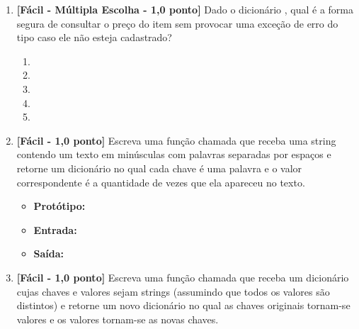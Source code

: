 \begin{enumerate}[label=\textbf{Q\arabic*.}, start=59]

\item \textbf{[Fácil - Múltipla Escolha - 1,0 ponto]} Dado o dicionário , qual é a forma segura de consultar o preço do item  sem provocar uma exceção de erro do tipo  caso ele não esteja cadastrado?

\begin{enumerate}[label=\textbf{(\Alph*)}]
    \item {}
    \item {}
    \item {}
    \item {}
    \item {}
\end{enumerate}



\vspace{0.4cm}

\item \textbf{[Fácil - 1,0 ponto]} Escreva uma função chamada  que receba uma string contendo um texto em minúsculas com palavras separadas por espaços e retorne um dicionário no qual cada chave é uma palavra e o valor correspondente é a quantidade de vezes que ela apareceu no texto.

\begin{itemize}[leftmargin=*]
    \item \textbf{Protótipo:}\newline {}\\
    \item \textbf{Entrada:} 
    \item \textbf{Saída:} 
\end{itemize}



\vspace{0.4cm}

\item \textbf{[Fácil - 1,0 ponto]} Escreva uma função chamada  que receba um dicionário cujas chaves e valores sejam strings (assumindo que todos os valores são distintos) e retorne um novo dicionário no qual as chaves originais tornam-se valores e os valores tornam-se as novas chaves.


\end{enumerate}
